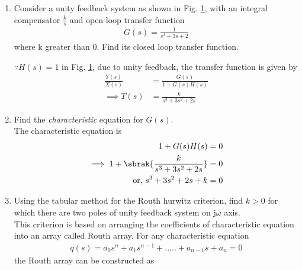 \begin{enumerate}[label=\thesection.\arabic*.,ref=\thesection.\theenumi]

\item
Consider a unity feedback system as shown in Fig.  \ref{fig:ee18btech11005}, with an integral compensator $\frac{k}{s}$ and open-loop transfer function
\begin{align}
G(s) = \frac{1}{s^2+3s+2}
\end{align}
where k greater than 0. 
%
Find its closed loop transfer function.
\begin{figure}[!ht]
	\begin{center}
		
		\resizebox{\columnwidth}{!}{}
	\end{center}
\caption{}
\label{fig:ee18btech11005}
\end{figure}

\solution $\because H(s) = 1$ in Fig.  \ref{fig:ee18btech11005}, due to unity feedback,   the transfer function is given by
\begin{align}
\frac{Y(s)}{X(s)} &= \frac{G(s)}{1+G(s)H(s)}
\\
\implies T(s) &= \frac{k}{s^3+3s^2+2s}
\end{align}
%
\item Find the {\em characteristic} equation for $G(s)$.
\\
\solution The characteristic equation is
\begin{align}
\label{eq:routh_char_eq}
 1 + G(s)H(s) &= 0 
\\
\implies 1 + \sbrak{\frac{k}{s^3+3s^2+2s}} &= 0
\\
\text{or, } s^3+3s^2+2s+k &= 0
\end{align}
\item Using the tabular method for the Routh hurwitz criterion, find $k > 0$ for which there are two poles of unity feedback system on j${\omega}$ axis.
%
\\
\solution 
This criterion is based on arranging the coefficients of characteristic equation into an array called Routh array.
For any characteristic equation 
\begin{multline}
q(s) = a_0s^n+a_1s^{n-1}+.....+a_{n-1}s+a_n = 0
\end{multline}
the Routh array can be constructed as 
 

\end{enumerate}
